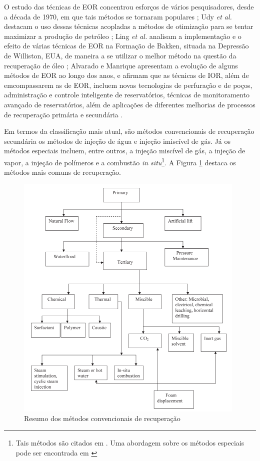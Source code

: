 O estudo das t\'{e}cnicas de EOR concentrou esfor\c{c}os de v\'{a}rios pesquisadores, desde a d\'{e}cada de 1970, em que tais m\'{e}todos se tornaram populares \cite{coats1982}; Udy \textit{et al.} destacam o uso dessas t\'{e}cnicas acopladas a m\'{e}todos de otimiza\c{c}\~{a}o para se tentar maximizar a produ\c{c}\~{a}o de petr\'{o}leo \cite{udyEOR}; Ling \textit{et al.} analisam a implementa\c{c}\~{a}o e o efeito de v\'{a}rias t\'{e}cnicas de EOR na Forma\c{c}\~{a}o de Bakken, situada na Depress\~{a}o de Williston, EUA, de maneira a se utilizar o melhor m\'{e}todo na quest\~{a}o da recupera\c{c}\~{a}o de \'{o}leo \cite{ling2014}; Alvarado e Manrique apresentam a evolu\c{c}\~{a}o de alguns m\'{e}todos de EOR ao longo dos anos, e afirmam que as t\'{e}cnicas de IOR, al\'{e}m de emcompassarem as de EOR, incluem novas tecnologias de perfura\c{c}\~{a}o e de po\c{c}os, administra\c{c}\~{a}o e controle inteligente de reservat\'{o}rios, t\'{e}cnicas de monitoramento avan\c{c}ado de reservat\'{o}rios, al\'{e}m de aplica\c{c}\~{o}es de diferentes melhorias de processos de recupera\c{c}\~{a}o prim\'{a}ria e secund\'{a}ria \cite{alvarado2010}.

Em termos da classifica\c{c}\~{a}o mais atual, s\~{a}o m\'{e}todos convencionais de recupera\c{c}\~{a}o secund\'{a}ria os m\'{e}todos de inje\c{c}\~{a}o de \'{a}gua e inje\c{c}\~{a}o imisc\'{i}vel de g\'{a}s. J\'{a} os m\'{e}todos especiais incluem, entre outros, a inje\c{c}\~{a}o misc\'{i}vel de g\'{a}s, a inje\c{c}\~{a}o de vapor, a inje\c{c}\~{a}o de pol\'{i}meros e a combust\~{a}o \textit{in situ}\footnote{Tais m\'{e}todos s\~{a}o citados em \cite{oil1976}. Uma abordagem sobre os m\'{e}todos especiais pode ser encontrada em \cite[pp. 677-726]{engres}}. A Figura \ref{fig:recreview} destaca os m\'{e}todos mais comuns de recupera\c{c}\~{a}o.

\begin{figure}[!ht]
	\centering
	\includegraphics[width=.6\textwidth]{figs/revisao/revisao_recmethods}
	\caption{Resumo dos m\'{e}todos convencionais de recupera\c{c}\~{a}o \cite{adeniyi2008} \label{fig:recreview}}
\end{figure}


